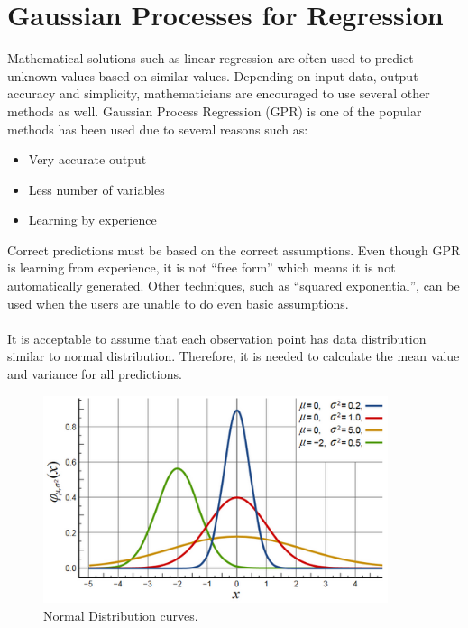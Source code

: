 \section{Gaussian Processes for Regression}
Mathematical solutions such as linear regression are often used to predict unknown values based on similar values. Depending on input data, output accuracy and simplicity, mathematicians are encouraged to use several other methods as well.
Gaussian Process Regression (GPR) is one of the popular methods has been used due to several reasons such as:
\begin{itemize}
\item Very accurate output
\item Less number of variables
\item Learning by experience
\end{itemize}
Correct predictions must be based on the correct assumptions. Even though GPR is  learning from experience, it is not “free form” which means it is not automatically generated\cite{gausreg}. Other techniques, such as “squared exponential”, can be used when the users are unable to do even basic assumptions.
\\\\
It is acceptable to assume that each observation point has data distribution similar to normal distribution. Therefore, it is needed  to calculate the mean value and variance for all predictions.
\begin{figure}[here]
  \centering
      \includegraphics[width=0.9\textwidth]{theory/graphics/normal-distribution.png}
  \caption{Normal Distribution curves\cite{normal-dist}. }
  \label{fig:normal-distribution}
\end{figure}
